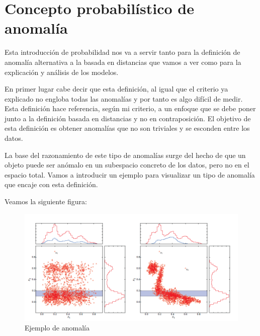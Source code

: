 \chapter{Concepto probabilístico de anomalía}
\label{chapter:anomalia_probabilidad}

Esta introducción de probabilidad nos va a servir tanto para la definición de anomalía alternativa a la basada en distancias que vamos a ver como para la explicación y análisis de los modelos.

En primer lugar cabe decir que esta definición, al igual que el criterio ya explicado no engloba todas las anomalías y por tanto es algo difícil de medir. Esta definición hace referencia, según mi criterio, a un enfoque que se debe poner junto a la definición basada en distancias y no en contraposición. El objetivo de esta definición es obtener anomalías que no son triviales y se esconden entre los datos.

La base del razonamiento de este tipo de anomalías surge del hecho de que un objeto puede ser anómalo en un subespacio concreto de los datos, pero no en el espacio total. Vamos a introducir un ejemplo para visualizar un tipo de anomalía que encaje con esta definición.

Veamos la siguiente figura:

\begin{figure}[H]
	\centering
	\label{ejemplo_anomalia_probabilidad}
	\includegraphics[scale=0.6]{imagenes/ejemplo_anomalia_probabilidad}
	\caption{Ejemplo de anomalía \cite{fabian_keller_hics:_2012}}
\end{figure}


